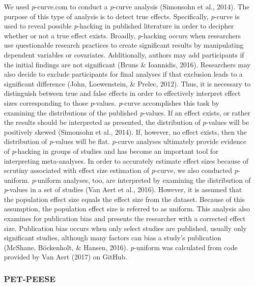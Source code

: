 \documentclass[man, mask]{apa6}
\newcounter{author}
\theoremstyle{definition}
\theoremstyle{definition}
\theoremstyle{definition}
\theoremstyle{remark}
\begin{document}
We used \emph{p}-curve.com to conduct a \emph{p}-curve analysis
(Simonsohn et al., 2014). The purpose of this type of analysis is to
detect true effects. Specifically, \emph{p}-curve is used to reveal
possible \emph{p}-hacking in published literature in order to decipher
whether or not a true effect exists. Broadly, \emph{p}-hacking occurs
when researchers use questionable research practices to create
significant results by manipulating dependent variables or covariates.
Additionally, authors may add participants if the initial findings are
not significant (Bruns \& Ioannidis, 2016). Researchers may also decide
to exclude participants for final analyses if that exclusion leads to a
significant difference (John, Loewenstein, \& Prelec, 2012). Thus, it is
necessary to distinguish between true and false effects in order to
effectively interpret effect sizes corresponding to those
\emph{p}-values. \emph{p}-curve accomplishes this task by examining the
distributions of the published \emph{p}-values. If an effect exists, or
rather the results should be interpreted as presented, the distribution
of \emph{p}-values will be positively skewed (Simonsohn et al., 2014).
If, however, no effect exists, then the distribution of \emph{p}-values
will be flat. \emph{p}-curve analyses ultimately provide evidence of
\emph{p}-hacking in groups of studies and has become an important tool
for interpreting meta-analyses. In order to accurately estimate effect
sizes because of scrutiny associated with effect size estimation of
\emph{p}-curve, we also conducted \emph{p}-uniform. \emph{p}-uniform
analyses, too, are interpreted by examining the distribution of
\emph{p}-values in a set of studies (Van Aert et al., 2016). However, it
is assumed that the population effect size equals the effect size from
the dataset. Because of this assumption, the population effect size is
referred to as uniform. This analysis also examines for publication bias
and presents the researcher with a corrected effect size. Publication
bias occurs when only select studies are published, usually only
significant studies, although many factors can bias a study's
publication (McShane, Böckenholt, \& Hansen, 2016). \emph{p}-uniform was
calculated from code provided by Van Aert (2017) on GitHub.

\subsubsection{PET-PEESE}\label{pet-peese}
\end{document}
